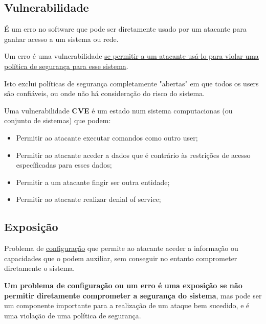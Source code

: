 \documentclass{article}
\begin{document}
  \subsection{Vulnerabilidade}

  É um erro no software que pode ser diretamente usado por um atacante para
  ganhar acesso a um sistema ou rede.

  \begin{flushleft}
    Um erro é uma vulnerabilidade \uline{se permitir a um atacante usá-lo para violar
    uma política de segurança para esse sistema}.

    Isto exclui políticas de segurança completamente "abertas" em que todos os users
    são confiáveis, ou onde não há consideração do risco do sistema.

    \pagebreak

    Uma vulnerabilidade \textbf{CVE} é um estado num sistema computacionas
    (ou conjunto de sistemas) que podem:
    \begin{itemize}
      \item Permitir ao atacante executar comandos como outro user;
      \item Permitir ao atacante aceder a dados que é contrário às restrições
      de acesso específicadas para esses dados;
      \item Permitir a um atacante fingir ser outra entidade;
      \item Permitir ao atacante realizar denial of service;
    \end{itemize}
  \end{flushleft}

  \subsection{Exposição}

  Problema de \uline{configuração} que permite ao atacante aceder a informação ou capacidades que o podem
  auxiliar, sem conseguir no entanto comprometer diretamente o sistema.

  \vspace{2mm}

  \textbf{Um problema de configuração ou um erro é uma exposição se não permitir
  diretamente comprometer a segurança do sistema}, mas pode ser um componente
  importante para a realização de um ataque bem sucedido, e é uma violação
  de uma política de segurança.

  \vspace{2mm}
\end{document}
